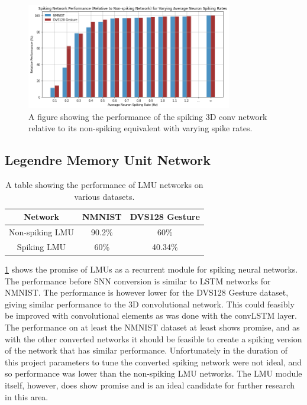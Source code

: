 \begin{figure}[htb]
    \centering
    \includegraphics[width=0.8\textwidth]{testingandresults/images/spiking_perfromace_with_varying_spike_rate.png}
    \caption{A figure showing the performance of the spiking 3D conv network relative to its non-spiking equivalent with varying spike rates.}
    \label{fig:spiking_perfromace_with_varying_spike_rate}
\end{figure}

\subsection{Legendre Memory Unit Network}

\begin{table}[htb]
    \centering
    \begin{tabular}{|| c | c | c ||}
        \hline
        Network     & NMNIST & DVS128 Gesture \\
        \hline \hline
        Non-spiking LMU        &  90.2\%    &    60\%  \\
        \hline
        Spiking LMU        &  60\%    &   40.34\%   \\
        \hline
    \end{tabular}
    \caption{A table showing the performance of LMU networks on various datasets.}
    \label{tab:lmu_performance}
\end{table}

\cref{tab:lmu_performance} shows the promise of LMUs as a recurrent module for spiking neural networks. The performance before SNN conversion is similar to LSTM networks for NMNIST. The performance is however lower for the DVS128 Gesture dataset, giving similar performance to the 3D convolutional network. This could feasibly be improved with convolutional elements as was done with the convLSTM layer. The performance on at least the NMNIST dataset at least shows promise, and as with the other converted networks it should be feasible to create a spiking version of the network that has similar performance. Unfortunately in the duration of this project parameters to tune the converted spiking network were not ideal, and so performance was lower than the non-spiking LMU networks. The LMU module itself, however, does show promise and is an ideal candidate for further research in this area.